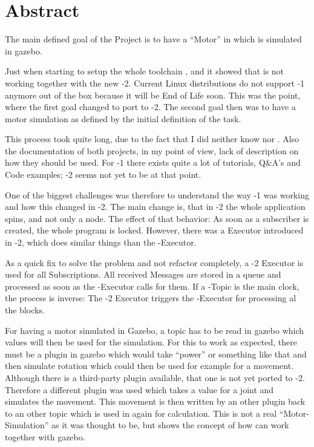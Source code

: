 
\section*{Abstract} \label{sec:abstract}

The main defined goal of the Project is to have a ``Motor'' in  which is simulated in \Gls{gazebo}.

Just when starting to setup the whole toolchain ,  and  it showed that  is not working together with the new -2.
Current Linux distributions do not support -1 anymore out of the box because it will be End of Life soon.
This was the point, where the first goal changed to port  to -2.
The second goal then was to have a motor simulation as defined by the initial definition of the task.

This process took quite long, due to the fact that I did neither know  nor .
Also the documentation of both projects, in my point of view, lack of description on how they should be used.
For -1 there exists quite a lot of tutorials, Q\&A's and Code examples; -2 seems not yet to be at that point.

One of the biggest challenges was therefore to understand the way -1 was working and how this changed in -2.
The main change is, that in -2 the whole application spins, and not only a node.
The effect of that behavior: As soon as a subscriber is created, the whole  program is locked.
However, there was a Executor introduced in -2, which does similar things than the -Executor.

As a quick fix to solve the problem and not refactor  completely, a -2 Executor is used for all Subscriptions.
All received Messages are stored in a queue and processed as soon as the -Executor calls for them.
If a -Topic is the main clock, the process is inverse: The -2 Executor triggers the -Executor for processing al the blocks.

For having a motor simulated in Gazebo, a topic has to be read in gazebo which values will then be used for the simulation.
For this to work as expected, there must be a plugin in \Gls{gazebo} which would take ``power'' or something like that  and then simulate rotation which could then be used for example for a movement.
Although there is a third-party plugin available, that one is not yet ported to -2.
Therefore a different plugin was used which takes a value for a joint and simulates the movement.
This movement is then written by an other plugin back to an other topic which is used in  again for calculation.
This is not a real ``Motor-Simulation'' as it was thought to be, but shows the concept of how  can work together with \Gls{gazebo}.
